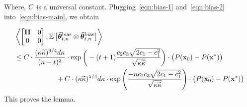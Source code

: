 	Where, $C$ is a universal constant.
	Plugging~\eqref{eqn:bias-1} and~\eqref{eqn:bias-2} into~\eqref{eqn:bias-main}, we obtain
	\iffalse
	\begin{align*}
		&\iprod{\begin{bmatrix}
			\Cov & \zero \\ \zero & \zero
			\end{bmatrix} }{\E{\thetavb^{\textrm{bias}} \otimes \thetavb^{\text{bias}}}} \\ &\leq \frac{1792}{(n-t)^2(\cone\cfour)^{5/4}}\cdot\frac{(\cnH\cnS)^{9/4}d}{\delta\cfour}\cdot\exp\bigg(-(t+1)\frac{\ctwo\cthree\sqrt{2\cone-\cone^2}}{\sqrt{\cnH\cnS}}\bigg)\norm{\thetat[0]}^2 + \\ &\qquad\qquad\frac{5376}{(\cone\cfour)^{1/4}}\frac{(\cnH\cnS)^{5/4}d}{\delta\cfour}\exp\left(\frac{-n \ctwo \cthree \sqrt{2\cone-\cone^2} }{\sqrt{\cnH\cnS}}\right) \cdot \norm{\thetat[0]}^2
			\end{align*}
			\fi
	\begin{align*}
		&\left\langle \begin{bmatrix}
			\mathbf{H} & 0 \\ 0 & 0
			\end{bmatrix} , \mathbb{E}\left[{\bar{\boldsymbol{\theta}}}_{t,n}^{\textrm{bias}} \otimes {\bar{\boldsymbol{\theta}}}_{t,n}^{\text{bias}}\right] \right\rangle\nonumber\\ &\leq			C\cdot\frac{({\kappa}\widetilde{\kappa})^{9/4}d{\kappa}}{(n-t)^2}\cdot\exp\bigg(-(t+1)\frac{c_2c_3\sqrt{2c_1-c_1^2}}{\sqrt{{\kappa}\widetilde{\kappa}}}\bigg)\cdot \big(P(\mathbf{x}_0)-P(\mathbf{x}^*)\big) \nonumber\\&\qquad\qquad\qquad+  C\cdot({\kappa}\widetilde{\kappa})^{5/4}d{\kappa}\cdot\exp\left(\frac{-n c_2 c_3 \sqrt{2c_1-c_1^2} }{\sqrt{{\kappa}\widetilde{\kappa}}}\right) \cdot \big(P(\mathbf{x}_0)-P(\mathbf{x}^*)\big)
			\end{align*}
	This proves the lemma.
